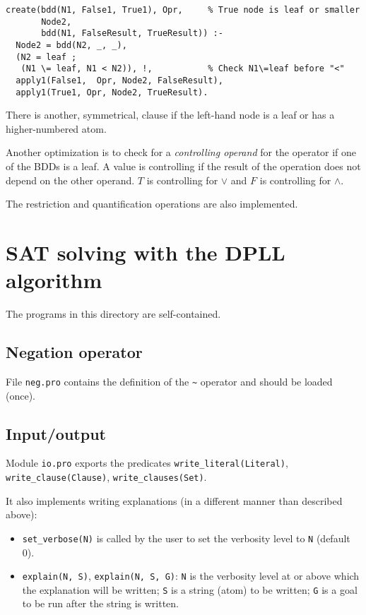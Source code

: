 \documentclass[11pt]{article}
\newcommand*{\p}[1]{\textup{\texttt{#1}}}
\begin{document}
\begin{verbatim}
create(bdd(N1, False1, True1), Opr,     % True node is leaf or smaller
       Node2,
       bdd(N1, FalseResult, TrueResult)) :-
  Node2 = bdd(N2, _, _),                   
  (N2 = leaf ;
   (N1 \= leaf, N1 < N2)), !,           % Check N1\=leaf before "<"
  apply1(False1,  Opr, Node2, FalseResult),
  apply1(True1, Opr, Node2, TrueResult).
\end{verbatim}

There is another, symmetrical, clause if the left-hand node is a leaf or
has a higher-numbered atom.

Another optimization is to check for a \emph{controlling operand}
for the operator if one of the BDDs is a leaf. A value is controlling if
the result of the operation does not depend on the other operand. $T$ is
controlling for $\vee$ and $F$ is controlling for $\wedge$.

The restriction and quantification operations are also implemented.

\newpage

\section{SAT solving with the DPLL algorithm}

The programs in this directory are self-contained.

\subsection{Negation operator}
File \p{neg.pro} contains the definition of the \verb+~+ operator
and should be loaded (once).

\subsection{Input/output}

Module \p{io.pro} exports the predicates \p{write\_literal(Literal)},
\p{write\_clause(Clause)}, \p{write\_clauses(Set)}.

It also implements writing explanations (in a different manner than
described above):
\begin{itemize}
\item \p{set\_verbose(N)} is called by the user to set the verbosity
level to \p{N} (default 0).

\item \p{explain(N, S)}, \p{explain(N, S, G)}: \p{N} is the verbosity
level at or above which the explanation will be written; \p{S} is a
string (atom) to be written; \p{G} is a goal to be run after the string
is written.
\end{itemize}
\end{document}
